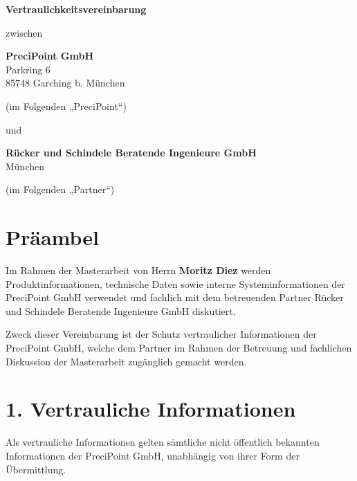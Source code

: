 \documentclass[11pt]{article}
\begin{document}
\begin{center}
    {\LARGE \textbf{Vertraulichkeitsvereinbarung}}\\[1cm]
\end{center}

\vspace{0.5cm}

zwischen

\vspace{0.5cm}

\textbf{PreciPoint GmbH}\\
Parkring 6\\
85748 Garching b. München\\

\vspace{0.3cm}

(im Folgenden „PreciPoint“)

\vspace{0.8cm}

und

\vspace{0.5cm}

\textbf{Rücker und Schindele Beratende Ingenieure GmbH}\\
München\\

\vspace{0.3cm}

(im Folgenden „Partner“)

\vspace{1cm}

\section*{Präambel}

Im Rahmen der Masterarbeit von Herrn \textbf{Moritz Diez} werden Produktinformationen, technische Daten sowie interne Systeminformationen der PreciPoint GmbH verwendet und fachlich mit dem betreuenden Partner Rücker und Schindele Beratende Ingenieure GmbH diskutiert.

Zweck dieser Vereinbarung ist der Schutz vertraulicher Informationen der PreciPoint GmbH, welche dem Partner im Rahmen der Betreuung und fachlichen Diskussion der Masterarbeit zugänglich gemacht werden.

\section*{1. Vertrauliche Informationen}

Als vertrauliche Informationen gelten sämtliche nicht öffentlich bekannten Informationen der PreciPoint GmbH, unabhängig von ihrer Form der Übermittlung.
\end{document}
